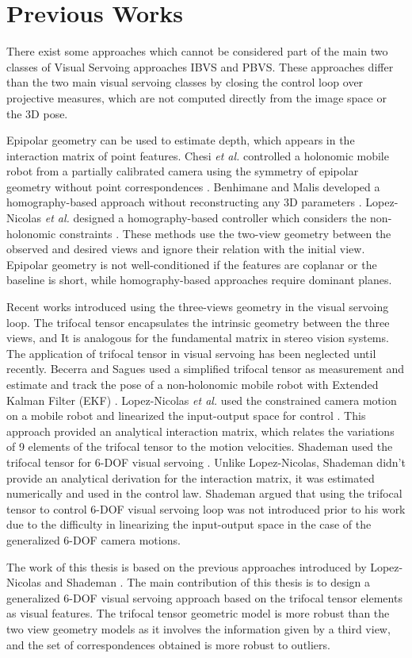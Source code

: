 \section{Previous Works}
There exist some approaches which cannot be considered part of the main two classes of Visual Servoing approaches IBVS and PBVS. These approaches differ than the two main visual servoing classes by closing the control loop over projective measures, which are not computed directly from the image space or the 3D pose.

Epipolar geometry can be used to estimate depth, which appears in the interaction matrix of point features\cite{malis20002}. Chesi \textit{et al.} controlled a holonomic mobile robot from a partially calibrated camera using the symmetry of epipolar geometry without point correspondences \cite{chesi}. Benhimane and Malis developed a homography-based approach without reconstructing any 3D parameters \cite{Malis}. Lopez-Nicolas \textit{et al.} designed a homography-based controller which considers the non-holonomic constraints \cite{lopez2006}. These methods use the two-view geometry between the observed and desired views and ignore their relation with the initial view. Epipolar geometry is not well-conditioned if the features are coplanar or the baseline is short, while homography-based approaches require dominant planes.

Recent works introduced using the three-views geometry in the visual servoing loop. The trifocal tensor encapsulates the intrinsic geometry between the three views, and It is analogous for the fundamental matrix in stereo vision systems. The application of trifocal tensor in visual servoing has been neglected until recently. Becerra and Sagues used a simplified trifocal tensor as measurement and estimate and track the pose of a non-holonomic mobile robot with Extended Kalman Filter (EKF) \cite{becerra2009pose}. Lopez-Nicolas \textit{et al.} used the constrained camera motion on a mobile robot and linearized the input-output space for control \cite{lopez2010visual}. This approach provided an analytical interaction matrix, which relates the variations of 9 elements of the trifocal tensor to the motion velocities. Shademan used the trifocal tensor for 6-DOF visual servoing \cite{shademan2010three}. Unlike Lopez-Nicolas, Shademan didn't provide an analytical derivation for the interaction matrix, it was estimated numerically and used in the control law. Shademan argued that using the trifocal tensor to control 6-DOF visual servoing loop was not introduced prior to his work due to the difficulty in linearizing the input-output space in the case of the generalized 6-DOF camera motions.

The work of this thesis is based on the previous approaches introduced by Lopez-Nicolas \cite{lopez2010visual} and Shademan \cite{shademan2010three}. The main contribution of this thesis is to design a generalized 6-DOF visual servoing approach based on the trifocal tensor elements as visual features. The trifocal tensor geometric model is more robust than the two view geometry models as it involves the information given by a third view, and the set of correspondences obtained is more robust to outliers.
